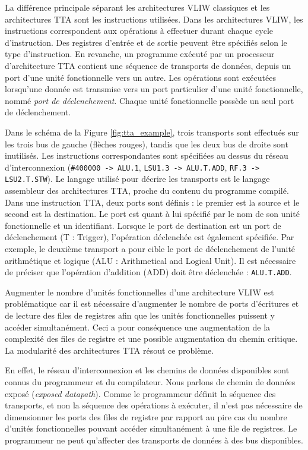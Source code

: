 La différence principale séparant les architectures VLIW classiques et les architectures TTA sont les instructions utilisées. Dans les architectures VLIW, les instructions correspondent aux opérations à effectuer durant chaque cycle d'instruction. Des registres d'entrée et de sortie peuvent être spécifiés selon le type d'instruction. En revanche, un programme exécuté par un processeur d'architecture TTA contient une séquence de transports de données, depuis un port d'une unité fonctionnelle vers un autre. Les opérations sont exécutées lorsqu'une donnée est transmise vers un port particulier d'une unité fonctionnelle, nommé \textit{port de déclenchement}. Chaque unité fonctionnelle possède un seul port de déclenchement.

Dans le schéma de la Figure \ref{fig:tta_example}, trois transports sont effectués sur les trois bus de gauche (flèches rouges), tandis que les deux bus de droite sont inutilisés. Les instructions correspondantes sont spécifiées au dessus du réseau d'interconnexion (\texttt{\#400000 -> ALU.1}, \texttt{LSU1.3 -> ALU.T.ADD}, \texttt{RF.3 -> LSU2.T.STW}). Le langage utilisé pour décrire les transports est le langage assembleur des architectures TTA, proche du contenu du programme compilé. Dans une instruction TTA, deux ports sont définis : le premier est la source et le second est la destination. Le port est quant à lui spécifié par le nom de son unité fonctionnelle et un identifiant. Lorsque le port de destination est un port de déclenchement (T : Trigger), l'opération déclenchée est également spécifiée. Par exemple, le deuxième transport a pour cible le port de déclenchement de l'unité arithmétique et logique (ALU : Arithmetical and Logical Unit). Il est nécessaire de préciser que l'opération d'addition (ADD) doit être déclenchée : \texttt{ALU.T.ADD}.

Augmenter le nombre d'unités fonctionnelles d'une architecture VLIW est problématique car il est nécessaire d'augmenter le nombre de ports d'écritures et de lecture des files de registres afin que les unités fonctionnelles puissent y accéder simultanément. Ceci a pour conséquence une augmentation de la complexité des files de registre et une possible augmentation du chemin critique.
La modularité des architectures TTA résout ce problème.

En effet, le réseau d'interconnexion et les chemins de données disponibles sont connus du programmeur et du compilateur. Nous parlons de \og chemin de données exposé \fg (\textit{exposed datapath}). Comme le programmeur définit la séquence des transports, et non la séquence des opérations à exécuter, il n'est pas nécessaire de dimensionner les ports des files de registre par rapport au pire cas du nombre d'unités fonctionnelles pouvant accéder simultanément à une file de registres. Le programmeur ne peut qu'affecter des transports de données à des bus disponibles.

